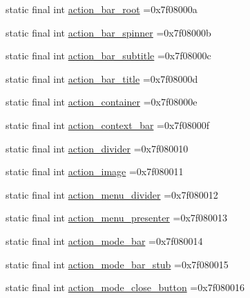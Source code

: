 \begin{DoxyCompactItemize}
\item 
static final int \mbox{\hyperlink{classbr_1_1unb_1_1cic_1_1mp_1_1marketmaster_1_1R_1_1id_afd330b562aec556e68a6113c7f21450c}{action\+\_\+bar\+\_\+root}} =0x7f08000a
\item 
static final int \mbox{\hyperlink{classbr_1_1unb_1_1cic_1_1mp_1_1marketmaster_1_1R_1_1id_a1db978de08e8aea650fa329abdd0cf3c}{action\+\_\+bar\+\_\+spinner}} =0x7f08000b
\item 
static final int \mbox{\hyperlink{classbr_1_1unb_1_1cic_1_1mp_1_1marketmaster_1_1R_1_1id_a90d6bce64a24783ec3ee7a17723645fd}{action\+\_\+bar\+\_\+subtitle}} =0x7f08000c
\item 
static final int \mbox{\hyperlink{classbr_1_1unb_1_1cic_1_1mp_1_1marketmaster_1_1R_1_1id_a941b8f42ca5bd188ae1b0f2c3065f16c}{action\+\_\+bar\+\_\+title}} =0x7f08000d
\item 
static final int \mbox{\hyperlink{classbr_1_1unb_1_1cic_1_1mp_1_1marketmaster_1_1R_1_1id_ac69279475e07e3d55916bde68650899b}{action\+\_\+container}} =0x7f08000e
\item 
static final int \mbox{\hyperlink{classbr_1_1unb_1_1cic_1_1mp_1_1marketmaster_1_1R_1_1id_ae6dfff01807b376939a4ba704a7da193}{action\+\_\+context\+\_\+bar}} =0x7f08000f
\item 
static final int \mbox{\hyperlink{classbr_1_1unb_1_1cic_1_1mp_1_1marketmaster_1_1R_1_1id_a851f213fc50b4a0f3c561e769c59aa31}{action\+\_\+divider}} =0x7f080010
\item 
static final int \mbox{\hyperlink{classbr_1_1unb_1_1cic_1_1mp_1_1marketmaster_1_1R_1_1id_af6f98a0a7ee17a75691b21f9437b1530}{action\+\_\+image}} =0x7f080011
\item 
static final int \mbox{\hyperlink{classbr_1_1unb_1_1cic_1_1mp_1_1marketmaster_1_1R_1_1id_a8fc0ab33a251c9f05a7ad1275486ed8a}{action\+\_\+menu\+\_\+divider}} =0x7f080012
\item 
static final int \mbox{\hyperlink{classbr_1_1unb_1_1cic_1_1mp_1_1marketmaster_1_1R_1_1id_a25eaa4463e14a585dbf162b841493812}{action\+\_\+menu\+\_\+presenter}} =0x7f080013
\item 
static final int \mbox{\hyperlink{classbr_1_1unb_1_1cic_1_1mp_1_1marketmaster_1_1R_1_1id_a149c08196c0006470dc070581b40eb78}{action\+\_\+mode\+\_\+bar}} =0x7f080014
\item 
static final int \mbox{\hyperlink{classbr_1_1unb_1_1cic_1_1mp_1_1marketmaster_1_1R_1_1id_ad44325a7fe8369f2608c43e91824f69e}{action\+\_\+mode\+\_\+bar\+\_\+stub}} =0x7f080015
\item 
static final int \mbox{\hyperlink{classbr_1_1unb_1_1cic_1_1mp_1_1marketmaster_1_1R_1_1id_ab921aeb78eca420006d3b133b51c7237}{action\+\_\+mode\+\_\+close\+\_\+button}} =0x7f080016

\end{DoxyCompactItemize}
